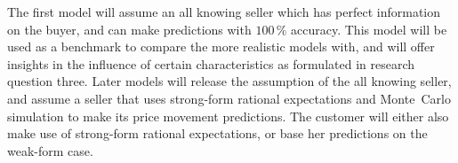 The first model will assume an all knowing seller which has perfect information on the buyer, and can make predictions with $100\,\%$ accuracy. This model will be used as a benchmark to compare the more realistic models with, and will offer insights in the influence of certain characteristics as formulated in research question three. Later models will release the assumption of the all knowing seller, and assume a seller that uses strong-form rational expectations and Monte~Carlo simulation to make its price movement predictions. The customer will either also make use of strong-form rational expectations, or base her predictions on the weak-form case.


